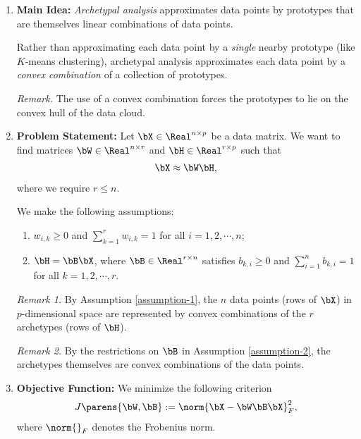 \documentclass[12pt]{article}
\begin{document}
\begin{enumerate}[label=\textbf{\arabic*.}]

	\item \textbf{Main Idea:} \emph{Archetypal analysis} approximates data points by prototypes that are themselves linear combinations of data points. 
	
	Rather than approximating each data point by a \emph{single} nearby prototype (like $K$-means clustering), archetypal analysis approximates each data point by a \emph{convex combination} of a collection of prototypes. 
	
	\textit{Remark.} The use of a convex combination forces the prototypes to lie on the convex hull of the data cloud. 
	
	\item \textbf{Problem Statement:} Let $\bX \in \Real^{n \times p}$ be a data matrix. We want to find matrices $\bW \in \Real^{n \times r}$ and $\bH \in \Real^{r \times p}$ such that 
	\begin{align*}
		\bX \approx \bW \bH, 
	\end{align*}
	where we require $r \le n$. 
	
	We make the following assumptions: 
	\begin{enumerate}[label=(\alph*)]
		\item \label{assumption-1} $w_{i,k} \ge 0$ and $\sum_{k=1}^r w_{i,k} = 1$ for all $i = 1, 2, \cdots, n$; 
		\item \label{assumption-2} $\bH = \bB \bX$, where $\bB \in \Real^{r \times n}$ satisfies $b_{k,i} \ge 0$ and $\sum_{i=1}^n b_{k,i} = 1$ for all $k = 1, 2, \cdots, r$. 
	
	\end{enumerate}
	
	\textit{Remark 1.} By Assumption \ref{assumption-1}, the $n$ data points (rows of $\bX$) in $p$-dimensional space are represented by convex combinations of the $r$ archetypes (rows of $\bH$). 
	
	\textit{Remark 2.} By the restrictions on $\bB$ in Assumption \ref{assumption-2}, the archetypes themselves are convex combinations of the data points. 
	
	\item \textbf{Objective Function:} We minimize the following criterion 
	\begin{align}
		J \parens{\bW, \bB} := \norm{\bX - \bW \bB \bX}_F^2, 
	\end{align}
	where $\norm{}_F$ denotes the Frobenius norm. 
	

\end{enumerate}
\end{document}
